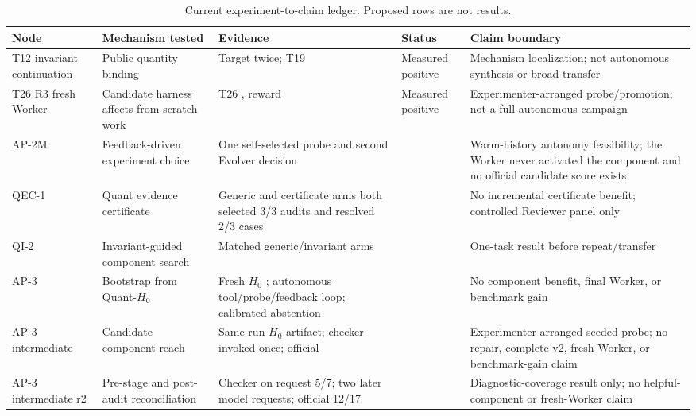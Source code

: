 \begin{table}[t]
\caption{Current experiment-to-claim ledger. Proposed rows are not results.}
\label{tab:claim-ledger}
\centering
\small
\begin{tabular}{p{}p{}p{}p{}p{}}
\toprule
Node & Mechanism tested & Evidence & Status & Claim boundary \\
\midrule
T12 invariant continuation & Public quantity binding & Target
\TwelveInvariantTarget{} twice; T19 \NineteenProtection{} & Measured positive &
Mechanism localization; not autonomous synthesis or broad transfer \\

T26 R3 fresh Worker & Candidate harness affects from-scratch work & T26
\TtwentysixFreshCandidate{}, reward \TtwentysixFreshReward{} & Measured positive &
Experimenter-arranged probe/promotion; not a full autonomous campaign \\

AP-2M & Feedback-driven experiment choice & One self-selected probe and second
Evolver decision & \APTwoMStatus{} & Warm-history autonomy feasibility; the
Worker never activated the component and no official candidate score exists \\

QEC-1 & Quant evidence certificate & Generic and certificate arms both selected
3/3 audits and resolved 2/3 cases & \QIOneStatus{} & No incremental certificate
benefit; controlled Reviewer panel only \\

QI-2 & Invariant-guided component search & Matched generic/invariant arms &
\QITwoStatus{} & One-task result before repeat/transfer \\

AP-3 & Bootstrap from Quant-$H_0$ & Fresh $H_0$ \APThreeHZero{}; autonomous
tool/probe/feedback loop; calibrated abstention & \APThreeStatus{} & No component
benefit, final Worker, or benchmark gain \\

AP-3 intermediate & Candidate component reach & Same-run $H_0$ artifact;
checker invoked once; official \APThreeActivationScore{} &
\APThreeActivationStatus{} & Experimenter-arranged seeded probe; no repair,
complete-v2, fresh-Worker, or benchmark-gain claim \\

AP-3 intermediate r2 & Pre-stage and post-audit reconciliation & Checker on
request 5/7; two later model requests; official 12/17 &
\APThreeActivationRtwoStatus{} & Diagnostic-coverage result only; no helpful-
component or fresh-Worker claim \\


\end{tabular}
\end{table}

